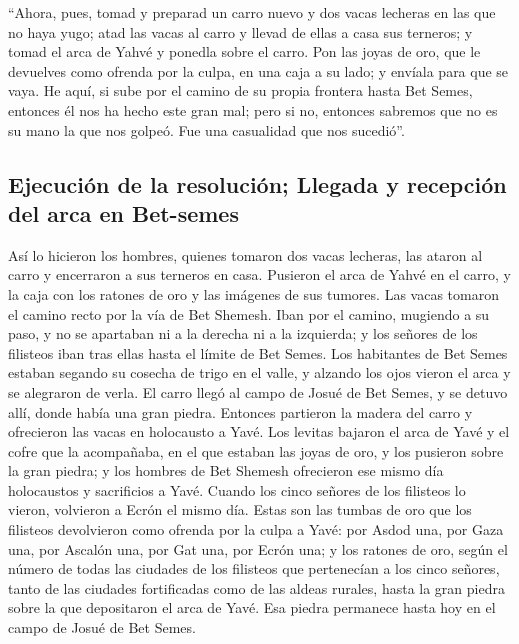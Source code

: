  ``Ahora, pues, tomad y preparad un carro nuevo y dos
vacas lecheras en las que no haya yugo; atad las vacas al carro y llevad
de ellas a casa sus terneros;  y tomad el arca de Yahvé y
ponedla sobre el carro. Pon las joyas de oro, que le devuelves como
ofrenda por la culpa, en una caja a su lado; y envíala para que se vaya.
 He aquí, si sube por el camino de su propia frontera
hasta Bet Semes, entonces él nos ha hecho este gran mal; pero si no,
entonces sabremos que no es su mano la que nos golpeó. Fue una
casualidad que nos sucedió''.

\hypertarget{ejecuciuxf3n-de-la-resoluciuxf3n-llegada-y-recepciuxf3n-del-arca-en-bet-semes}{%
\subsection{Ejecución de la resolución; Llegada y recepción del arca en
Bet-semes}\label{ejecuciuxf3n-de-la-resoluciuxf3n-llegada-y-recepciuxf3n-del-arca-en-bet-semes}}

 Así lo hicieron los hombres, quienes tomaron dos vacas
lecheras, las ataron al carro y encerraron a sus terneros en casa.
 Pusieron el arca de Yahvé en el carro, y la caja con los
ratones de oro y las imágenes de sus tumores.  Las vacas
tomaron el camino recto por la vía de Bet Shemesh. Iban por el camino,
mugiendo a su paso, y no se apartaban ni a la derecha ni a la izquierda;
y los señores de los filisteos iban tras ellas hasta el límite de Bet
Semes.  Los habitantes de Bet Semes estaban segando su
cosecha de trigo en el valle, y alzando los ojos vieron el arca y se
alegraron de verla.  El carro llegó al campo de Josué de
Bet Semes, y se detuvo allí, donde había una gran piedra. Entonces
partieron la madera del carro y ofrecieron las vacas en holocausto a
Yavé.  Los levitas bajaron el arca de Yavé y el cofre que
la acompañaba, en el que estaban las joyas de oro, y los pusieron sobre
la gran piedra; y los hombres de Bet Shemesh ofrecieron ese mismo día
holocaustos y sacrificios a Yavé.  Cuando los cinco
señores de los filisteos lo vieron, volvieron a Ecrón el mismo día.
 Estas son las tumbas de oro que los filisteos
devolvieron como ofrenda por la culpa a Yavé: por Asdod una, por Gaza
una, por Ascalón una, por Gat una, por Ecrón una;  y los
ratones de oro, según el número de todas las ciudades de los filisteos
que pertenecían a los cinco señores, tanto de las ciudades fortificadas
como de las aldeas rurales, hasta la gran piedra sobre la que
depositaron el arca de Yavé. Esa piedra permanece hasta hoy en el campo
de Josué de Bet Semes.

